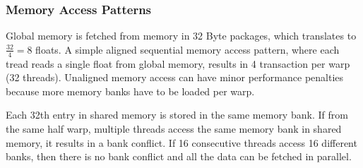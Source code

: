 \documentclass[]{article}
\begin{document}
\subsubsection{Memory Access Patterns}

Global memory is fetched from memory in 32 Byte packages, which translates to $\frac{32}{4} = 8$ floats. A simple aligned sequential memory access pattern, where each tread reads a single float from global memory, results in 4 transaction per warp (32 threads). Unaligned memory access can have minor performance penalties because more memory banks have to be loaded per warp. \cite{gMem}

Each 32th entry in shared memory is stored in the same memory bank. If from the same half warp, multiple threads access the same memory bank in shared memory, it results in a bank conflict. If 16 consecutive threads access 16 different banks, then there is no bank conflict and all the data can be fetched in parallel.


\begin{figure}[H]
	\begin{center}
	\end{center}
\end{figure}
\end{document}
